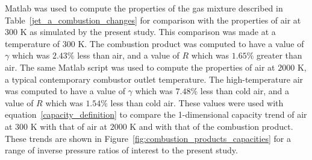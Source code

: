 \documentclass[a4paper, 11pt, oneside]{report}
\begin{document}
Matlab was used to compute the properties of the gas mixture described in Table~\ref{jet_a_combustion_changes} for comparison with the properties of air at $300$ K as simulated by the present study. This comparison was made at a temperature of $300$ K. The combustion product was computed to have a value of $\gamma$ which was $2.43\%$ less than air, and a value of $R$ which was $1.65\%$ greater than air. The same Matlab script was used to compute the properties of air at $2000$ K, a typical contemporary combustor outlet temperature. The high-temperature air was computed to have a value of $\gamma$ which was $7.48\%$ less than cold air, and a value of $R$ which was $1.54\%$ less than cold air. These values were used with equation~\ref{capacity_definition} to compare the 1-dimensional capacity trend of air at $300$ K with that of air at $2000$ K and with that of the combustion product. These trends are shown in Figure~\ref{fig:combustion_products_capacities} for a range of inverse pressure ratios of interest to the present study.
\end{document}
